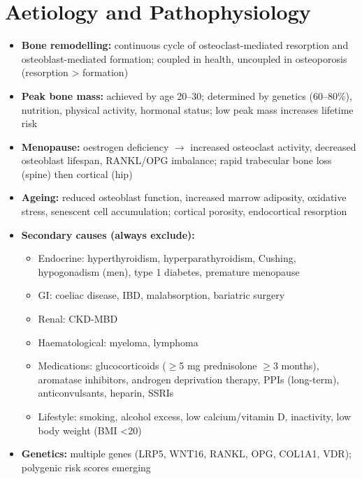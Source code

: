 \section*{Aetiology and Pathophysiology}
\begin{itemize}
    \item \textbf{Bone remodelling:} continuous cycle of osteoclast-mediated resorption and osteoblast-mediated formation; coupled in health, uncoupled in osteoporosis (resorption > formation)
    \item \textbf{Peak bone mass:} achieved by age 20--30; determined by genetics (60--80\%), nutrition, physical activity, hormonal status; low peak mass increases lifetime risk
    \item \textbf{Menopause:} oestrogen deficiency $\to$ increased osteoclast activity, decreased osteoblast lifespan, RANKL/OPG imbalance; rapid trabecular bone loss (spine) then cortical (hip)
    \item \textbf{Ageing:} reduced osteoblast function, increased marrow adiposity, oxidative stress, senescent cell accumulation; cortical porosity, endocortical resorption
    \item \textbf{Secondary causes (always exclude):}
    \begin{itemize}
        \item Endocrine: hyperthyroidism, hyperparathyroidism, Cushing, hypogonadism (men), type 1 diabetes, premature menopause
        \item GI: coeliac disease, IBD, malabsorption, bariatric surgery
        \item Renal: CKD-MBD
        \item Haematological: myeloma, lymphoma
        \item Medications: glucocorticoids ($\ge$5 mg prednisolone $\ge$3 months), aromatase inhibitors, androgen deprivation therapy, PPIs (long-term), anticonvulsants, heparin, SSRIs
        \item Lifestyle: smoking, alcohol excess, low calcium/vitamin D, inactivity, low body weight (BMI <20)
    \end{itemize}
    \item \textbf{Genetics:} multiple genes (LRP5, WNT16, RANKL, OPG, COL1A1, VDR); polygenic risk scores emerging
\end{itemize}

